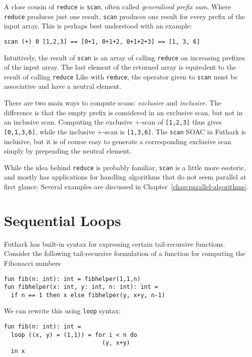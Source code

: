\documentclass[11pt]{book}
\begin{document}
A close cousin of \texttt{reduce} is \texttt{scan}, often called
\textit{generalised prefix sum}.  Where \texttt{reduce} produces just
one result, \texttt{scan} produces one result for every prefix of the
input array.  This is perhaps best understood with an example:

\begin{lstlisting}
scan (+) 0 [1,2,3] == [0+1, 0+1+2, 0+1+2+3] == [1, 3, 6]
\end{lstlisting}

Intuitively, the result of \texttt{scan} is an array of calling
\texttt{reduce} on increasing prefixes of the input array.  The last
element of the returned array is equivalent to the result of calling
\texttt{reduce} Like with \texttt{reduce}, the operator given to
\texttt{scan} must be associative and have a neutral element.

There are two main ways to compute scans: \textit{exclusive} and
\textit{inclusive}.  The difference is that the empty prefix is
considered in an exclusive scan, but not in an inclusive scan.
Computing the exclusive $+$-scan of \texttt{[1,2,3]} thus gives
\texttt{[0,1,3,6]}, while the inclusive $+$-scan is \texttt{[1,3,6]}.
The \texttt{scan} SOAC in Futhark is inclusive, but it is of course
easy to generate a corresponding exclusive scan simply by prepending
the neutral element.

While the idea behind \texttt{reduce} is probably familiar,
\texttt{scan} is a little more esoteric, and mostly has applications
for handling algorithms that do not seem parallel at first glance.
Several examples are discussed in
Chapter~\ref{chap:parallel-algorithms}.

\section{Sequential Loops}
\label{sec:sequential-loops}

Futhark has built-in syntax for expressing certain tail-recursive
functions.  Consider the following tail-recursive formulation of a
function for computing the Fibonacci numbers

\begin{lstlisting}
fun fib(n: int): int = fibhelper(1,1,n)
fun fibhelper(x: int, y: int, n: int): int =
  if n == 1 then x else fibhelper(y, x+y, n-1)
\end{lstlisting}

We can rewrite this using \texttt{loop} syntax:

\begin{lstlisting}
fun fib(n: int): int =
  loop ((x, y) = (1,1)) = for i < n do
                            (y, x+y)
  in x
\end{lstlisting}
\end{document}
